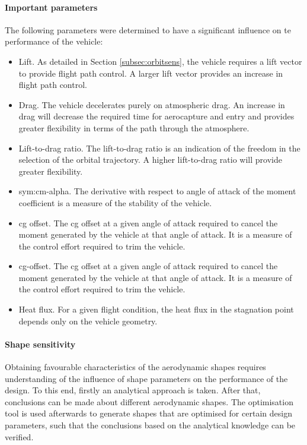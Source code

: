 


\paragraph{Important parameters}\label{sec:aeroparams}
 The following parameters were determined to have a significant influence on te performance of the vehicle:

\begin{itemize}
	\item{Lift. As detailed in Section \ref{subsec:orbitsens}, the vehicle requires a lift vector to provide flight path control. A larger lift vector provides an increase in flight path control.}
	\item{Drag. The vehicle decelerates purely on atmospheric drag. An increase in drag will decrease the required time for aerocapture and entry and provides greater flexibility in terms of the path through the atmosphere.}
	\item{Lift-to-drag ratio. The lift-to-drag ratio is an indication of the freedom in the selection of the orbital trajectory. A higher lift-to-drag ratio will provide greater flexibility.}
	\item{\gls{sym:cm-alpha}. The derivative with respect to angle of attack of the moment coefficient is a measure of the stability of the vehicle. }
	\item{\gls{cg} offset}. The \gls{cg} offset at a given angle of attack required to cancel the moment generated by the vehicle at that angle of attack. It is a measure of the control effort required to trim the vehicle. 
	\item{\gls{cg}-offset}. The \gls{cg} offset at a given angle of attack required to cancel the moment generated by the vehicle at that angle of attack. It is a measure of the control effort required to trim the vehicle. 
	\item{Heat flux. For a given flight condition, the heat flux in the stagnation point depends only on the vehicle geometry.  }
\end{itemize}


\paragraph{Shape sensitivity} \label{sec:aerooptima}
Obtaining favourable characteristics of the aerodynamic shapes requires understanding of the influence of shape parameters on the performance of the design. To this end, firstly an analytical approach is taken. After that, conclusions can be made about different aerodynamic shapes. The optimisation tool is used afterwards to generate shapes that are optimised for certain design parameters, such that the conclusions based on the analytical knowledge can be verified.

